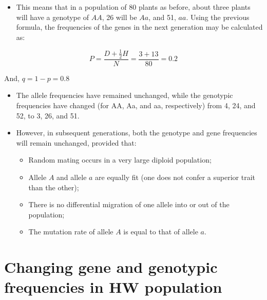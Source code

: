 \documentclass[11pt,ignorenonframetext,aspectratio=169]{beamer}
\providecommand{\tightlist}{%
  \setlength{\itemsep}{0pt}\setlength{\parskip}{0pt}}
\begin{document}
\begin{frame}{}
\protect\hypertarget{section-9}{}
\begin{itemize}
\tightlist
\item
  This means that in a population of 80 plants as before, about three
  plants will have a genotype of \(AA\), 26 will be \(Aa\), and 51,
  \(aa\). Using the previous formula, the frequencies of the genes in
  the next generation may be calculated as:
\end{itemize}

\[
P = \frac{D + \frac{1}{2} H}{N} = \frac{3+13}{80} = 0.2
\]

And, \(q = 1-p = 0.8\)

\begin{itemize}
\tightlist
\item
  The allele frequencies have remained unchanged, while the genotypic
  frequencies have changed (for AA, Aa, and aa, respectively) from 4,
  24, and 52, to 3, 26, and 51.
\item
  However, in subsequent generations, both the genotype and gene
  frequencies will remain unchanged, provided that:

  \begin{itemize}
  \tightlist
  \item
    Random mating occurs in a very large diploid population;
  \item
    Allele \(A\) and allele \(a\) are equally fit (one does not confer a
    superior trait than the other);
  \item
    There is no differential migration of one allele into or out of the
    population;
  \item
    The mutation rate of allele \(A\) is equal to that of allele \(a\).
  \end{itemize}
\end{itemize}
\end{frame}

\hypertarget{changing-gene-and-genotypic-frequencies-in-hw-population}{%
\section{Changing gene and genotypic frequencies in HW
population}\label{changing-gene-and-genotypic-frequencies-in-hw-population}}
\end{document}
